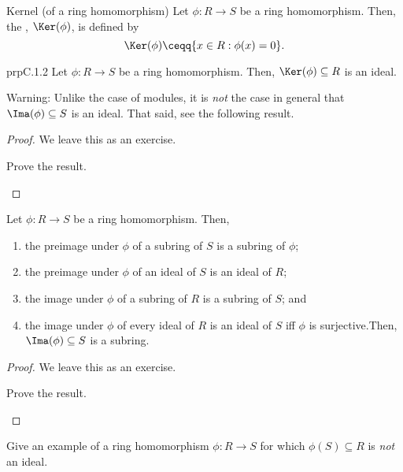 \begin{dfn}{Kernel (of a ring homomorphism)}{}
	Let $\phi \colon R\rightarrow S$ be a ring homomorphism.  Then, the , $\Ker (\phi )$\index[notation]{$\Ker (\phi )$}, is defined by
	\begin{equation}
		\Ker (\phi )\ceqq \{ x\in R:\phi (x)=0\} .
	\end{equation}
\end{dfn}
\begin{prp}{}{prpC.1.2}
	Let $\phi \colon R\rightarrow S$ be a ring homomorphism.  Then, $\Ker (\phi )\subseteq R$ is an ideal.
	\begin{rmk}
		Warning:  Unlike the case of modules, it is \emph{not} the case in general that $\Ima (\phi )\subseteq S$ is an ideal.  That said, see the following result.
	\end{rmk}
	\begin{proof}
		We leave this as an exercise.
		\begin{exr}[breakable=false]{}{}
			Prove the result.
		\end{exr}
	\end{proof}
\end{prp}
\begin{prp}{}{}
	Let $\phi \colon R\rightarrow S$ be a ring homomorphism.  Then,
	\begin{enumerate}
		\item the preimage under $\phi$ of a subring of $S$ is a subring of $\phi$;
		\item the preimage under $\phi$ of an ideal of $S$ is an ideal of $R$;
		\item the image under $\phi$ of a subring of $R$ is a subring of $S$; and
		\item the image under $\phi$ of every ideal of $R$ is an ideal of $S$ iff $\phi$ is surjective.Then, $\Ima (\phi )\subseteq S$ is a subring.
	\end{enumerate}
	\begin{proof}
		We leave this as an exercise.
		\begin{exr}[breakable=false]{}{}
			Prove the result.
		\end{exr}
	\end{proof}
\end{prp}
\begin{exr}{}{}
	Give an example of a ring homomorphism $\phi \colon R\rightarrow S$ for which $\phi (S)\subseteq R$ is \emph{not} an ideal.
\end{exr}

